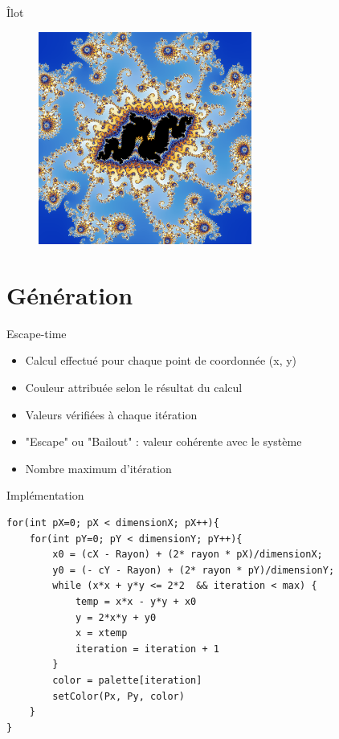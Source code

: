 \documentclass{beamer}
\begin{document}
\begin{frame}{Îlot}
\begin{figure}[H]
  \centering
  \includegraphics[width=70mm]{ilot.png}
 \end{figure}
\end{frame}

\section{Génération}
\begin{frame}{Escape-time}
\begin{block}{}
    \begin{itemize}
        \item Calcul effectué pour chaque point de coordonnée (x, y)
        \item Couleur attribuée selon le résultat du calcul
        \item Valeurs vérifiées à chaque itération 
        \item "Escape" ou "Bailout" : valeur cohérente avec le système
        \item Nombre maximum d'itération
    \end{itemize}
\end{block}
\end{frame}

\begin{frame}[fragile]{Implémentation}
  \begin{verbatim}
for(int pX=0; pX < dimensionX; pX++){
    for(int pY=0; pY < dimensionY; pY++){
        x0 = (cX - Rayon) + (2* rayon * pX)/dimensionX;
        y0 = (- cY - Rayon) + (2* rayon * pY)/dimensionY;
        while (x*x + y*y <= 2*2  && iteration < max) {
            temp = x*x - y*y + x0
            y = 2*x*y + y0
            x = xtemp
            iteration = iteration + 1
        }
        color = palette[iteration]
        setColor(Px, Py, color)
    } 
}

   \end{verbatim}
\end{frame}
\end{document}
